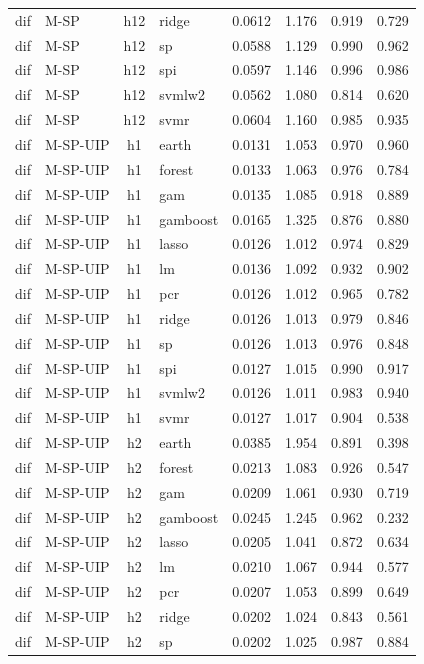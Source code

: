 \begin{ThreePartTable}
\begin{longtable}[t]{llclcccc}
dif & M-SP & h12 & ridge & 0.0612 & 1.176 & 0.919 & 0.729\\
dif & M-SP & h12 & sp & 0.0588 & 1.129 & 0.990 & 0.962\\
dif & M-SP & h12 & spi & 0.0597 & 1.146 & 0.996 & 0.986\\
dif & M-SP & h12 & svmlw2 & 0.0562 & 1.080 & 0.814 & 0.620\\
dif & M-SP & h12 & svmr & 0.0604 & 1.160 & 0.985 & 0.935\\
\addlinespace
dif & M-SP-UIP & h1 & earth & 0.0131 & 1.053 & 0.970 & 0.960\\
dif & M-SP-UIP & h1 & forest & 0.0133 & 1.063 & 0.976 & 0.784\\
dif & M-SP-UIP & h1 & gam & 0.0135 & 1.085 & 0.918 & 0.889\\
dif & M-SP-UIP & h1 & gamboost & 0.0165 & 1.325 & 0.876 & 0.880\\
dif & M-SP-UIP & h1 & lasso & 0.0126 & 1.012 & 0.974 & 0.829\\
dif & M-SP-UIP & h1 & lm & 0.0136 & 1.092 & 0.932 & 0.902\\
dif & M-SP-UIP & h1 & pcr & 0.0126 & 1.012 & 0.965 & 0.782\\
dif & M-SP-UIP & h1 & ridge & 0.0126 & 1.013 & 0.979 & 0.846\\
dif & M-SP-UIP & h1 & sp & 0.0126 & 1.013 & 0.976 & 0.848\\
dif & M-SP-UIP & h1 & spi & 0.0127 & 1.015 & 0.990 & 0.917\\
dif & M-SP-UIP & h1 & svmlw2 & 0.0126 & 1.011 & 0.983 & 0.940\\
dif & M-SP-UIP & h1 & svmr & 0.0127 & 1.017 & 0.904 & 0.538\\
\addlinespace
dif & M-SP-UIP & h2 & earth & 0.0385 & 1.954 & 0.891 & 0.398\\
dif & M-SP-UIP & h2 & forest & 0.0213 & 1.083 & 0.926 & 0.547\\
dif & M-SP-UIP & h2 & gam & 0.0209 & 1.061 & 0.930 & 0.719\\
dif & M-SP-UIP & h2 & gamboost & 0.0245 & 1.245 & 0.962 & 0.232\\
dif & M-SP-UIP & h2 & lasso & 0.0205 & 1.041 & 0.872 & 0.634\\
dif & M-SP-UIP & h2 & lm & 0.0210 & 1.067 & 0.944 & 0.577\\
dif & M-SP-UIP & h2 & pcr & 0.0207 & 1.053 & 0.899 & 0.649\\
dif & M-SP-UIP & h2 & ridge & 0.0202 & 1.024 & 0.843 & 0.561\\
dif & M-SP-UIP & h2 & sp & 0.0202 & 1.025 & 0.987 & 0.884\\

\end{longtable}
\end{ThreePartTable}
